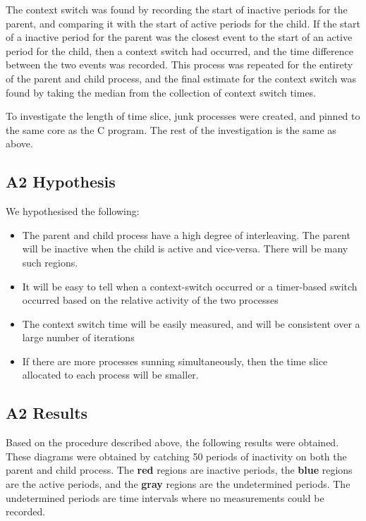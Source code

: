 \documentclass[a4paper, 12pt]{article}
\begin{document}
The context switch was found by recording the start of inactive periods for the parent, and comparing it with the start of active periods for the child. If the start of a inactive period for the parent was the closest event to the start of an active period for the child, then a context switch had occurred, and the time difference between the two events was recorded. This process was repeated for the entirety of the parent and child process, and the final estimate for the context switch was found by taking the median from the collection of context switch times.

To investigate the length of time slice, junk processes were created, and pinned to the same core as the C program. The rest of the investigation is the same as above.

\subsection{A2 Hypothesis}

We hypothesised the following:

\begin{itemize}
\item   The parent and child process have a high degree of interleaving. The parent will be inactive when the child is active and vice-versa. There will be many such regions.
\item   It will be easy to tell when a context-switch occurred or a timer-based switch occurred based on the relative activity of the two processes
\item   The context switch time will be easily measured, and will be consistent over a large number of iterations
\item	If there are more processes sunning simultaneously, then the time slice allocated to each process will be smaller.
\end{itemize}

\subsection{A2 Results}

Based on the procedure described above, the following results were obtained. These diagrams were obtained by catching 50 periods of inactivity on both the parent and child process. The \textbf{red} regions are inactive periods, the \textbf{blue} regions are the active periods, and the \textbf{gray} regions are the undetermined periods. The undetermined periods are time intervals where no measurements could be recorded.
\end{document}

